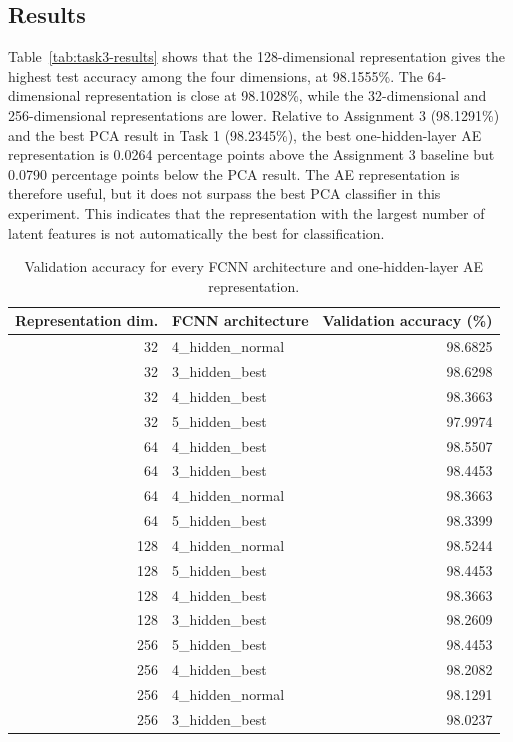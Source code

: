 \documentclass[conference,onecolumn]{IEEEtran}
\begin{document}
\subsection{Results}
Table~\ref{tab:task3-results} shows that the 128-dimensional representation gives the highest test accuracy among the four dimensions, at 98.1555\%. The 64-dimensional representation is close at 98.1028\%, while the 32-dimensional and 256-dimensional representations are lower. Relative to Assignment 3 (98.1291\%) and the best PCA result in Task 1 (98.2345\%),
the best one-hidden-layer AE representation is 0.0264 percentage points above the
Assignment 3 baseline but 0.0790 percentage points below the PCA result. The AE
representation is therefore useful, but it does not surpass the best PCA classifier in
this experiment. This indicates that the representation with the largest number of latent features is not automatically the best for classification.

\begin{table}[H]
\centering
\small
\caption{Validation accuracy for every FCNN architecture and one-hidden-layer AE representation.}
\label{tab:task3-all-val}
\begin{tabular}{r l r}
\toprule
Representation dim. & FCNN architecture & Validation accuracy (\%)\\
\midrule
32 & 4\_hidden\_normal & 98.6825 \\
32 & 3\_hidden\_best & 98.6298 \\
32 & 4\_hidden\_best & 98.3663 \\
32 & 5\_hidden\_best & 97.9974 \\
64 & 4\_hidden\_best & 98.5507 \\
64 & 3\_hidden\_best & 98.4453 \\
64 & 4\_hidden\_normal & 98.3663 \\
64 & 5\_hidden\_best & 98.3399 \\
128 & 4\_hidden\_normal & 98.5244 \\
128 & 5\_hidden\_best & 98.4453 \\
128 & 4\_hidden\_best & 98.3663 \\
128 & 3\_hidden\_best & 98.2609 \\
256 & 5\_hidden\_best & 98.4453 \\
256 & 4\_hidden\_best & 98.2082 \\
256 & 4\_hidden\_normal & 98.1291 \\
256 & 3\_hidden\_best & 98.0237 \\
\bottomrule
\end{tabular}
\end{table}
\end{document}
